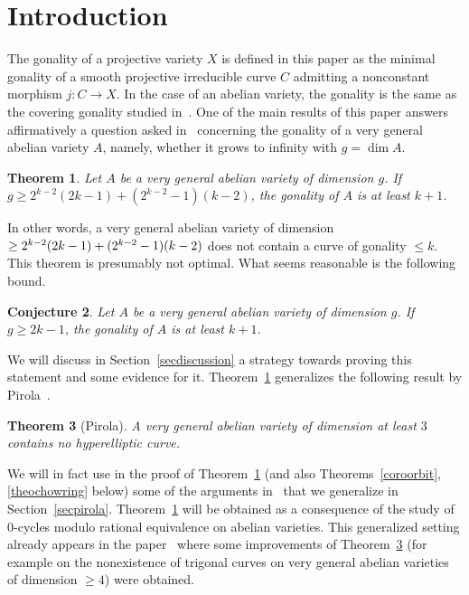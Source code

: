 \documentclass[11pt]{article}
\newtheorem{theo}{Theorem}[section]
\newtheorem{conj}[theo]{Conjecture}
\theoremstyle{definition}
\numberwithin{equation}{section}
\numberwithin{figure}{section}
\numberwithin{table}{section}
\begin{document}
\section{Introduction}

The gonality of a projective variety $X$ is defined in this paper as the minimal gonality of a smooth projective irreducible curve $C$ admitting a nonconstant morphism $j:C\rightarrow X$. In the case of an abelian variety, the gonality is the same as the covering gonality studied in~\cite{lazarsfeld}. One of the main results of this paper answers affirmatively a question asked in~\cite{lazarsfeld} concerning the gonality of a very general abelian variety $A$, namely, whether it grows to infinity with $g=\dim A$.

\begin{theo} \label{theogon}
Let $A$ be a very general abelian variety of dimension $g$. If $g\geq 2^{k-2}(2k-1)+(2^{k-2}-1)(k-2)$, the gonality of $A$ is at least $k+1$.
\end{theo}

In other words, a very general abelian variety of dimension $\geq 2^{k-2}(2k-1)+\linebreak
(2^{k-2}-1)(k-2)$ does not contain a curve of gonality $\leq k$. This theorem is presumably not optimal. What seems reasonable is the following bound.

\begin{conj}\label{conj}
Let $A$ be a very general abelian variety of dimension $g$.
If $g\geq 2k-1$, the gonality of $A$ is at least $k+1$.
\end{conj}

We will discuss in Section~\ref{secdiscussion} a strategy towards proving this statement and some evidence for it. Theorem~\ref{theogon} generalizes the following result by Pirola~\cite{pirola}.

\begin{theo}[Pirola]\label{theopirola}
A very general abelian variety of dimension at least $3$ contains no hyperelliptic curve.
\end{theo}

We will in fact use in the proof of Theorem~\ref{theogon} (and also Theorems~\ref{coroorbit}, \ref{theochowring} below) some of the arguments in~\cite{pirola} that we generalize in Section~\ref{secpirola}. Theorem~\ref{theogon} will be obtained as a consequence of the study of $0$-cycles modulo rational equivalence on abelian varieties. This generalized setting already appears in the paper~\cite{alzatipirola} where some improvements of Theorem~\ref{theopirola} (for example on the nonexistence of trigonal curves on very general abelian varieties of dimension $\geq 4$) were obtained.
\end{document}
